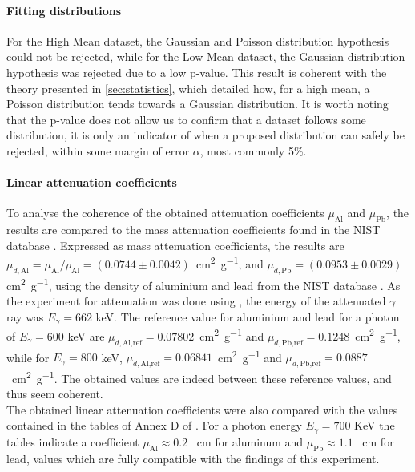 \paragraph{Fitting distributions}
For the High Mean dataset, the Gaussian and Poisson distribution hypothesis could not be rejected, while for the Low Mean dataset, the Gaussian distribution hypothesis was rejected due to a low p-value. This result is coherent with the theory presented in \autoref{sec:statistics}, which detailed how, for a high mean, a Poisson distribution tends towards a Gaussian distribution. It is worth noting that the p-value does not allow us to confirm that a dataset follows some distribution, it is only an indicator of when a proposed distribution can safely be rejected, within some margin of error \(\alpha\), most commonly 5\%.

\paragraph{Linear attenuation coefficients}
To analyse the coherence of the obtained attenuation coefficients \(\mu_\textrm{Al}\) and \(\mu_\textrm{Pb}\), the results are compared to the mass attenuation coefficients found in the NIST database \cite{massic-linear-attenuation}. Expressed as mass attenuation coefficients, the results are \linebreak \mbox{\(\mu_{d,\textrm{Al}} = \mu_{\textrm{Al}} / \rho_\textrm{Al} = \left(0.0744 \pm 0.0042\right)\) \si{\centi\meter\squared\per\gram}}, and \(\mu_{d,\textrm{Pb}} = \left(0.0953 \pm 0.0029\right)\) \si{\centi\meter\squared\per\gram}, using the density of aluminium and lead from the NIST database \cite{material-density}. As the experiment for attenuation was done using \cesium, the energy of the attenuated \(\gamma\) ray was \(E_\gamma = 662\) keV. The reference value for aluminium and lead for a photon of \(E_\gamma = 600\) keV are \mbox{\(\mu_{d,\textrm{Al,ref}} = 0.07802\) \si{\centi\meter\squared\per\gram}} and \mbox{\(\mu_{d,\textrm{Pb,ref}} = 0.1248\) \si{\centi\meter\squared\per\gram}}, while for \(E_\gamma = 800\) keV, \mbox{\(\mu_{d,\textrm{Al,ref}} = 0.06841\) \si{\centi\meter\squared\per\gram}} and \linebreak \mbox{\(\mu_{d,\textrm{Pb,ref}} = 0.0887\) \si{\centi\meter\squared\per\gram}}. The obtained values are indeed between these reference values, and thus seem coherent. \\
The obtained linear attenuation coefficients were also compared 
with the values contained in the tables of Annex D of \cite{notice_generale}.
For a photon energy $E_{\gamma} = 700$ KeV the tables indicate a coefficient 
$\mu_{\mathrm{Al}} \approx 0.2$ \unit{\per\cm} for aluminum and 
$\mu_{\mathrm{Pb}} \approx 1.1$ \unit{\per\cm} for lead,
values which are fully compatible with the findings of this experiment.

